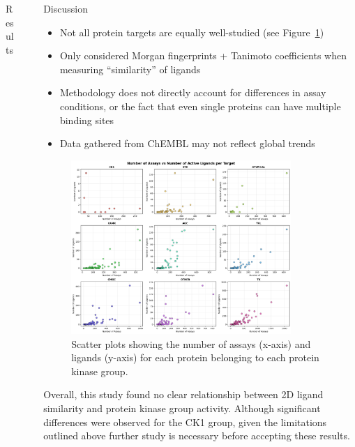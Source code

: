 \documentclass[final]{beamer}
\newlength{\sepwidth}
\newlength{\colwidth}
\newcommand{\separatorcolumn}{\begin{column}{\sepwidth}\end{column}}
\begin{document}
\begin{frame}[t]
\begin{columns}[t]
\begin{column}{\colwidth}
\begin{block}{Results}
  \end{block}

\end{column}

\separatorcolumn

\begin{column}{\colwidth} 
  \begin{block}{Discussion}
    \small
    \begin{itemize}
        \item Not all protein targets are equally well-studied (see Figure~\ref{assay_vs_ligand_plot})
        \item Only considered Morgan fingerprints + Tanimoto coefficients when measuring ``similarity'' of ligands
        \item Methodology does not directly account for differences in assay conditions, or the fact that even single proteins can have multiple binding sites
        \item Data gathered from ChEMBL may not reflect global trends
    \end{itemize}

    \begin{figure}
        \centering
        \includegraphics[width=0.85\textwidth]{../figures/assay_vs_ligand.png}
        \caption{Scatter plots showing the number of assays (x-axis) and ligands (y-axis) for each protein belonging to each protein kinase group.}
        \label{assay_vs_ligand_plot}
    \end{figure}

      \small
      Overall, this study found no clear relationship between 2D ligand similarity and protein kinase group activity. Although significant differences were observed for the CK1 group, given the limitations outlined above further study is necessary before accepting these results. 
  \end{block}


\end{column}
\end{columns}
\end{frame}
\end{document}
